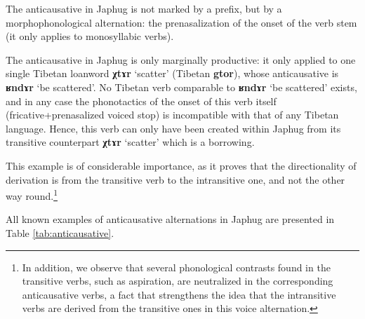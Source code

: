 \documentclass[oldfontcommands,oneside,a4paper,11pt]{article}
\newcommand{\ipa}[1]{\textbf{{\phon\mbox{#1}}}} %
\begin{document}
The anticausative in Japhug is not marked by a prefix, but by a morphophonological alternation: the prenasalization of the onset of the verb stem (it only applies to monosyllabic verbs).
 
The anticausative in Japhug is only marginally productive: it only applied to one single Tibetan loanword \ipa{χtɤr} `scatter' (Tibetan \ipa{gtor}), whose anticausative is \ipa{ʁndɤr} `be scattered'. No Tibetan verb comparable to \ipa{ʁndɤr} `be scattered' exists, and in any case the phonotactics of the onset of this verb itself (fricative+prenasalized voiced stop) is incompatible with that of any Tibetan language. Hence, this verb can only have been created within Japhug from its transitive counterpart \ipa{χtɤr} `scatter' which is a borrowing.

This example is of considerable importance, as it proves that the directionality of derivation is from the transitive verb to the intransitive one, and not the other way round.\footnote{In addition, we observe that several phonological contrasts found in the transitive verbs, such as aspiration, are neutralized in the corresponding anticausative verbs, a fact that strengthens the idea that the intransitive verbs are derived from the transitive ones in this voice alternation.} 

All known examples of anticausative alternations  in Japhug are presented in Table \ref{tab:anticausative}.
 
\end{document}
